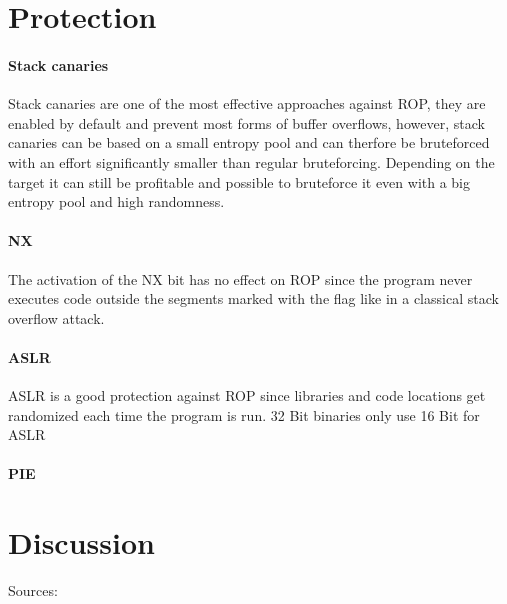 \documentclass[journal=tosc,submission, notanonymous]{iacrtrans}
\begin{document}
\section{Protection}
\paragraph{Stack canaries}
Stack canaries are one of the most effective approaches against ROP, they are enabled by default and prevent most forms of buffer overflows, however, stack canaries can be based on a small entropy pool and can therfore be bruteforced with an effort significantly smaller than regular bruteforcing. Depending on the target it can still be profitable and possible to bruteforce it even with a big entropy pool and high randomness.
\paragraph{NX}
The activation of the NX bit has no effect on ROP since the program never executes code outside the segments marked with the  flag like in a classical stack overflow attack.
\paragraph{ASLR}
ASLR is a good protection against ROP since libraries and code locations get randomized each time the program is run. 32 Bit binaries only use 16 Bit for ASLR
\paragraph{PIE}

\section{Discussion}
Sources:



\end{document}
